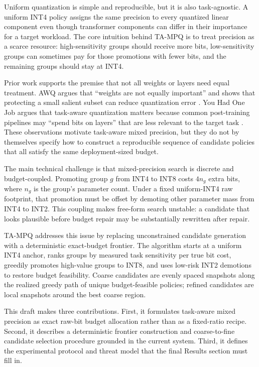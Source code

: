\documentclass{article}
\newcommand{\method}{TA-MPQ}
\newcommand{\inttwo}{INT2}
\newcommand{\intfour}{INT4}
\newcommand{\inteight}{INT8}
\begin{document}
Uniform quantization is simple and reproducible, but it is also task-agnostic. A uniform \intfour{} policy assigns the same precision to every quantized linear component even though transformer components can differ in their importance for a target workload. The core intuition behind \method{} is to treat precision as a scarce resource: high-sensitivity groups should receive more bits, low-sensitivity groups can sometimes pay for those promotions with fewer bits, and the remaining groups should stay at \intfour{}.

Prior work supports the premise that not all weights or layers need equal treatment. AWQ argues that ``weights are not equally important'' and shows that protecting a small salient subset can reduce quantization error \cite{lin2024awq}. You Had One Job argues that task-aware quantization matters because common post-training pipelines may ``spend bits on layers'' that are less relevant to the target task \cite{levi2026youhadonejob}. These observations motivate task-aware mixed precision, but they do not by themselves specify how to construct a reproducible sequence of candidate policies that all satisfy the same deployment-sized budget.

The main technical challenge is that mixed-precision search is discrete and budget-coupled. Promoting group $g$ from \intfour{} to \inteight{} costs $4n_g$ extra bits, where $n_g$ is the group's parameter count. Under a fixed uniform-\intfour{} raw footprint, that promotion must be offset by demoting other parameter mass from \intfour{} to \inttwo{}. This coupling makes free-form search unstable: a candidate that looks plausible before budget repair may be substantially rewritten after repair.

\method{} addresses this issue by replacing unconstrained candidate generation with a deterministic exact-budget frontier. The algorithm starts at a uniform \intfour{} anchor, ranks groups by measured task sensitivity per true bit cost, greedily promotes high-value groups to \inteight{}, and uses low-risk \inttwo{} demotions to restore budget feasibility. Coarse candidates are evenly spaced snapshots along the realized greedy path of unique budget-feasible policies; refined candidates are local snapshots around the best coarse region.

This draft makes three contributions. First, it formulates task-aware mixed precision as exact raw-bit budget allocation rather than as a fixed-ratio recipe. Second, it describes a deterministic frontier construction and coarse-to-fine candidate selection procedure grounded in the current system. Third, it defines the experimental protocol and threat model that the final Results section must fill in.
\end{document}
